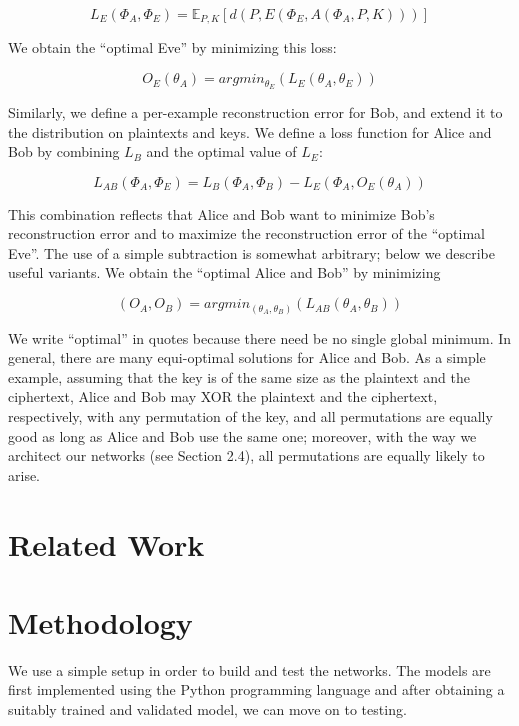\documentclass[a4paper]{article}
\begin{document}
      \[ L_{E}(\Phi_{A}, \Phi_{E}) = \mathbb{E}_{P,K} [ d(P, E(\Phi_{E}, A(\Phi_{A},  P, K))) ] \]

      We obtain the “optimal Eve” by minimizing this loss:
      
      \[ O_{E}(\theta_{A}) = argmin_{\theta_{E}}(L_{E}(\theta_{A}, \theta_{E})) \]

      Similarly, we define a per-example reconstruction error for Bob, and extend it to the 
      distribution on plaintexts and keys. We define a loss function for Alice and Bob by 
      combining $L_{B}$ and the optimal value of $L_{E}$:
      
      \[ L_{AB}(\Phi_{A}, \Phi_{E}) = L_{B}(\Phi_{A}, \Phi_{B}) - L_{E}(\Phi_{A}, O_{E}(\theta_{A})) \]
      
      This combination reflects that Alice and Bob want to minimize Bob’s reconstruction error and to
      maximize the reconstruction error of the “optimal Eve”. The use of a simple subtraction is somewhat
      arbitrary; below we describe useful variants. We obtain the “optimal Alice and Bob” by minimizing
      
      \[ (O_{A}, O_{B}) = argmin_{(\theta_{A}, \theta_{B})}(L_{AB}(\theta_{A}, \theta_{B})) \]
      
      We write “optimal” in quotes because there need be no single global minimum. In general, there
      are many equi-optimal solutions for Alice and Bob. As a simple example, assuming that the key is
      of the same size as the plaintext and the ciphertext, Alice and Bob may XOR the plaintext and the
      ciphertext, respectively, with any permutation of the key, and all permutations are equally good as
      long as Alice and Bob use the same one; moreover, with the way we architect our networks (see
      Section 2.4), all permutations are equally likely to arise.
    

  
  \section{Related Work}
  
  \pagebreak
  \section{Methodology}
  We use a simple setup in order to build and test the networks. The models are 
  first implemented using the Python programming language and after obtaining a 
  suitably trained and validated model, we can move on to testing. 
\end{document}

